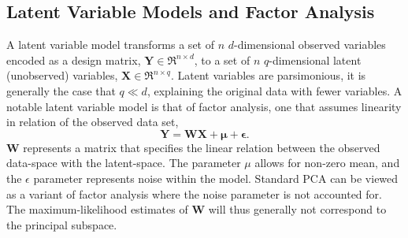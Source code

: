 \documentclass[ %
author={Dillon Keith Diep},
supervisor={Dr. Carl Henrik Ek},
degree={MEng},
title={ART-CG:},
subtitle={Assisted Real-time Content Generation of 3D Hair by Learning Manifolds},
type={Research},
year={2017} ]{dissertation}
\begin{document}
\subsection{Latent Variable Models and Factor Analysis}
A latent variable model transforms a set of $n$ $d$-dimensional observed variables encoded as a design matrix, $\bm{Y}\in\Re^{n \times d}$, to a set of $n$ $q$-dimensional latent (unobserved) variables, $\bm{X}\in\Re^{n \times q}$. Latent variables are parsimonious, it is generally the case that $q \ll d$, explaining the original data with fewer variables. A notable latent variable model is that of factor analysis, one that assumes linearity in relation of the observed data set,
\begin{equation} \label{ppca:fa}
\bm{Y=WX+\mu+\epsilon}.
\end{equation}
$\bm{W}$ represents a matrix that specifies the linear relation between the observed data-space with the latent-space.
The parameter $\mu$ allows for non-zero mean, and the $\epsilon$ parameter represents noise within the model. Standard PCA can be viewed as a variant of factor analysis where the noise parameter is not accounted for. The maximum-likelihood estimates of $\bm{W}$ will thus generally not correspond to the principal subspace. 
\end{document}
